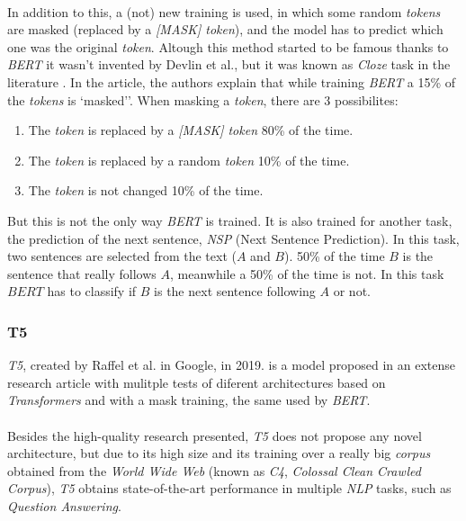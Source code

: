 \paragraph{}
In addition to this, a (not) new training is used, in which some random \emph{tokens} are masked (replaced by a \emph{[MASK] token}), and the model has to predict which one was the original \emph{token}. Altough this method started to be famous thanks to \emph{BERT} it wasn't invented by Devlin et al., but it was known as \emph{Cloze} task in the literature \cite{Taylor1953}. In the article, the authors explain that while training \emph{BERT} a 15\% of the \emph{tokens} is `masked''. When masking a \emph{token}, there are 3 possibilites:
\begin{enumerate}
\item The \emph{token} is replaced by a \emph{[MASK] token} 80\% of the time.
\item The \emph{token} is replaced by a random \emph{token} 10\% of the time.
\item The \emph{token} is not changed 10\% of the time.
\end{enumerate}
But this is not the only way \emph{BERT} is trained. It is also trained for another task, the prediction of the next sentence, \emph{NSP} (Next Sentence Prediction). In this task, two sentences are selected from the text ($A$ and $B$). 50\% of the time $B$ is the sentence that really follows $A$, meanwhile a 50\% of the time is not. In this task $BERT$ has to classify if $B$ is the next sentence following $A$ or not. 
\subsubsection{T5}
\noindent \emph{T5}, created by Raffel et al. in Google, in 2019.\cite{Raffel2019} is a model proposed in an extense research article with mulitple tests of diferent architectures based on \emph{Transformers} and with a mask training, the same used by \emph{BERT}.
\paragraph{}
Besides the high-quality research presented, \emph{T5} does not propose any novel architecture, but due to its high size and its training over a really big \emph{corpus} obtained from the \emph{World Wide Web} (known as \emph{C4}, \emph{Colossal Clean Crawled Corpus}), \emph{T5} obtains state-of-the-art performance in multiple \emph{NLP} tasks, such as \emph{Question Answering}.
